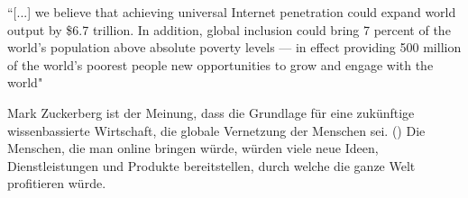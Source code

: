 \documentclass{article}
\begin{document}
``[...] we believe that achieving universal Internet penetration could expand world output by \$6.7 trillion.  
In addition, global inclusion could bring 7 percent of the world’s population above absolute poverty levels — in effect providing 500 
million of the world’s poorest people new opportunities to grow and engage with the world"
\parencite{connectWorld}

\medskip

Mark Zuckerberg ist der Meinung, dass die Grundlage für eine zukünftige wissenbassierte Wirtschaft, die globale Vernetzung der Menschen sei.
(\cite{HumanRight})
Die Menschen, die man online bringen würde, würden viele neue Ideen, Dienstleistungen und Produkte bereitstellen, durch welche die ganze Welt profitieren würde.
\end{document}
